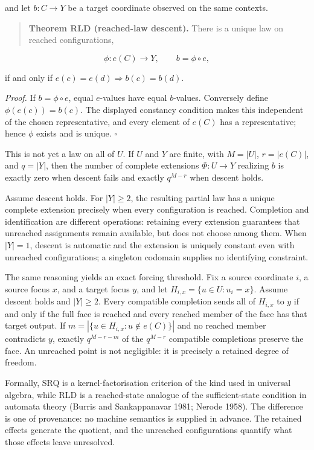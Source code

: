 \documentclass[11pt,a4paper]{article}
\begin{document}
and let \(b:C \rightarrow Y\) be a target coordinate observed on the
same contexts.

\begin{quote}
\textbf{Theorem RLD (reached-law descent).} There is a unique law on
reached configurations,
\end{quote}

\[\phi:e(C) \rightarrow Y,\quad\quad b = \phi \circ e,\]

if and only if \(e(c) = e(d) \Rightarrow b(c) = b(d)\).

\emph{Proof.} If \(b = \phi \circ e\), equal \(e\)-values have equal
\(b\)-values. Conversely define \(\phi\left( e(c) \right) = b(c)\). The
displayed constancy condition makes this independent of the chosen
representative, and every element of \(e(C)\) has a representative;
hence \(\phi\) exists and is unique. \(\ensuremath{\square}\)

This is not yet a law on all of \(U\). If \(U\) and \(Y\) are finite,
with \(M = |U|\), \(r = \left| e(C) \right|\), and \(q = |Y|\), then the
number of complete extensions \(\Phi:U \rightarrow Y\) realizing \(b\)
is exactly zero when descent fails and exactly \(q^{M - r}\) when
descent holds.

Assume descent holds. For \(|Y| \geq 2\), the resulting partial law has
a unique complete extension precisely when every configuration is
reached. Completion and identification are different operations:
retaining every extension guarantees that unreached assignments remain
available, but does not choose among them. When \(|Y| = 1\), descent is
automatic and the extension is uniquely constant even with unreached
configurations; a singleton codomain supplies no identifying constraint.

The same reasoning yields an exact forcing threshold. Fix a source
coordinate \(i\), a source focus \(x\), and a target focus \(y\), and
let \(H_{i,x} = \{ u \in U:u_{i} = x\}\). Assume descent holds and
\(|Y| \geq 2\). Every compatible completion sends all of \(H_{i,x}\) to
\(y\) if and only if the full face is reached and every reached member
of the face has that target output. If
\(m = \left| \{ u \in H_{i,x}:u \notin e(C)\} \right|\) and no reached
member contradicts \(y\), exactly \(q^{M - r - m}\) of the \(q^{M - r}\)
compatible completions preserve the face. An unreached point is not
negligible: it is precisely a retained degree of freedom.

Formally, SRQ is a kernel-factorisation criterion of the kind used in
universal algebra, while RLD is a reached-state analogue of the
sufficient-state condition in automata theory (Burris and Sankappanavar
1981; Nerode 1958). The difference is one of provenance: no machine
semantics is supplied in advance. The retained effects generate the
quotient, and the unreached configurations quantify what those effects
leave unresolved.
\end{document}

